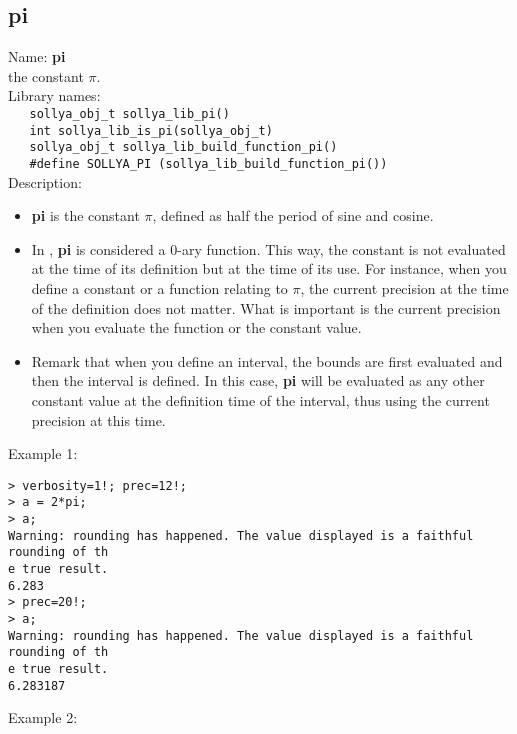 \subsection{pi}
\label{labpi}
\noindent Name: \textbf{pi}\\
\phantom{aaa}the constant $\pi$.\\[0.2cm]
\noindent Library names:\\
\verb|   sollya_obj_t sollya_lib_pi()|\\
\verb|   int sollya_lib_is_pi(sollya_obj_t)|\\
\verb|   sollya_obj_t sollya_lib_build_function_pi()|\\
\verb|   #define SOLLYA_PI (sollya_lib_build_function_pi())|\\[0.2cm]
\noindent Description: \begin{itemize}

\item \textbf{pi} is the constant $\pi$, defined as half the period of sine and cosine.

\item In \sollya, \textbf{pi} is considered a 0-ary function. This way, the constant 
   is not evaluated at the time of its definition but at the time of its use. For 
   instance, when you define a constant or a function relating to $\pi$, the current
   precision at the time of the definition does not matter. What is important is 
   the current precision when you evaluate the function or the constant value.

\item Remark that when you define an interval, the bounds are first evaluated and 
   then the interval is defined. In this case, \textbf{pi} will be evaluated as any 
   other constant value at the definition time of the interval, thus using the 
   current precision at this time.
\end{itemize}
\noindent Example 1: 
\begin{center}\begin{minipage}{15cm}\begin{Verbatim}[frame=single]
> verbosity=1!; prec=12!;
> a = 2*pi;
> a;
Warning: rounding has happened. The value displayed is a faithful rounding of th
e true result.
6.283
> prec=20!;
> a;
Warning: rounding has happened. The value displayed is a faithful rounding of th
e true result.
6.283187
\end{Verbatim}
\end{minipage}\end{center}
\noindent Example 2: 
